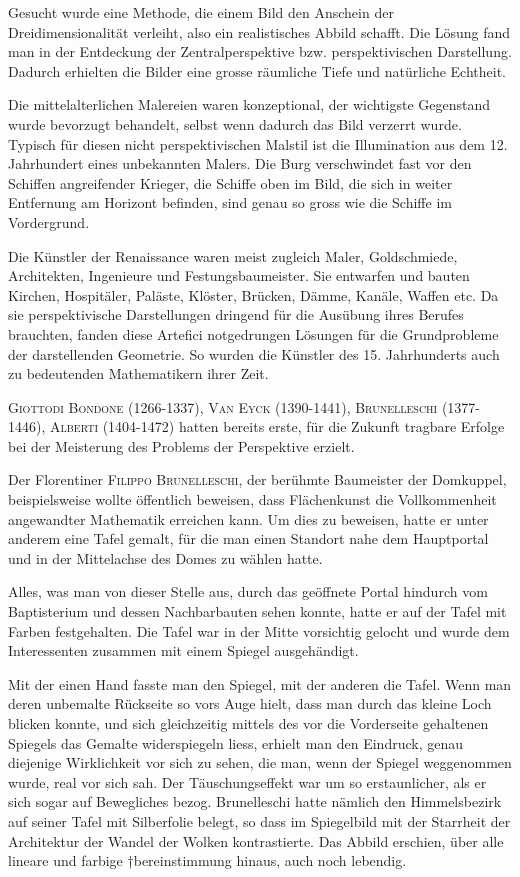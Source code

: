 \documentclass[%
11pt,%
twoside,%
titlepage,%
a4page,%
german,%
headsepline%
]{scrartcl}
\begin{document}
Gesucht wurde eine Methode, die einem Bild den Anschein der Dreidimensionalit\"at verleiht, also ein realistisches Abbild schafft. Die L\"osung fand man in der Entdeckung der Zentralperspektive bzw. perspektivischen Darstellung. Dadurch erhielten die Bilder eine grosse r\"aumliche Tiefe und nat\"urliche Echtheit.

Die mittelalterlichen Malereien waren \glqq konzeptional\grqq, der wichtigste Gegenstand wurde bevorzugt behandelt, selbst wenn dadurch das Bild verzerrt wurde. Typisch f\"ur diesen nicht perspektivischen Malstil ist die Illumination aus dem 12. Jahrhundert eines unbekannten Malers. Die Burg verschwindet fast vor den Schiffen angreifender Krieger, die Schiffe oben im Bild, die sich in weiter Entfernung am Horizont befinden, sind genau so gross wie die Schiffe im Vordergrund.

Die K\"unstler der Renaissance waren meist zugleich Maler, Goldschmiede, Architekten, Ingenieure und Festungsbaumeister. Sie entwarfen und bauten Kirchen, Hospit\"aler, Pal\"aste, Kl\"oster, Br\"ucken, D\"amme, Kan\"ale, Waffen etc. Da sie perspektivische Darstellungen dringend f\"ur die Aus\"ubung ihres Berufes brauchten, fanden diese Artefici notgedrungen L\"osungen f\"ur die Grundprobleme der darstellenden Geometrie. So wurden die K\"unstler des 15. Jahrhunderts auch zu bedeutenden Mathematikern ihrer Zeit.

\textsc{Giottodi Bondone} (1266-1337), \textsc{Van Eyck} (1390-1441), \textsc{Brunelleschi} (1377-1446), \textsc{Alberti} (1404-1472) hatten bereits erste, f\"ur die Zukunft tragbare Erfolge bei der Meisterung des Problems der Perspektive erzielt.

Der Florentiner \textsc{Filippo Brunelleschi}, der ber\"uhmte Baumeister der Domkuppel, beispielsweise wollte \"offentlich beweisen, dass Fl\"achenkunst die Vollkommenheit angewandter Mathematik erreichen kann. Um dies zu beweisen, hatte er unter anderem eine Tafel gemalt, f\"ur die man einen Standort nahe dem Hauptportal und in der Mittelachse des Domes zu w\"ahlen hatte.

Alles, was man von dieser Stelle aus, durch das ge\"offnete Portal hindurch vom Baptisterium und dessen Nachbarbauten sehen konnte, hatte er auf der Tafel mit Farben festgehalten. Die Tafel war in der Mitte vorsichtig gelocht und wurde dem Interessenten zusammen mit einem Spiegel ausgeh\"andigt.

Mit der einen Hand fasste man den Spiegel, mit der anderen die Tafel. Wenn man deren unbemalte R\"uckseite so vors Auge hielt, dass man durch das kleine Loch blicken konnte, und sich gleichzeitig mittels des vor die Vorderseite gehaltenen Spiegels das Gemalte widerspiegeln liess, erhielt man den Eindruck, genau diejenige Wirklichkeit vor
sich zu sehen, die man, wenn der
Spiegel weggenommen wurde, real vor sich sah. Der T\"auschungseffekt war um so erstaunlicher, als er sich sogar auf Bewegliches bezog. Brunelleschi hatte n\"amlich den Himmelsbezirk auf seiner Tafel mit Silberfolie belegt, so dass im Spiegelbild mit der Starrheit der Architektur der Wandel der Wolken kontrastierte. Das Abbild erschien, \"uber alle lineare und farbige †bereinstimmung hinaus, auch noch lebendig.
\end{document}
